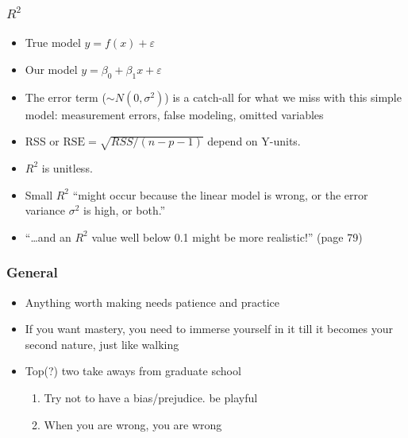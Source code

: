 \documentclass[serif, xcolor={dvipsnames}]{beamer} %
\newcommand\dangersign[1][2ex]{%
  \renewcommand\stacktype{L}%
  \scaleto{\stackon[1.3pt]{\color{red}$\triangle$}{\tiny !}}{#1}%
}
\newcommand{\Rq}{{\faSearch~}}
\begin{document}
\begin{frame}[t]
\frametitle{$R^2$}
\begin{itemize}[<+->]
\item True model $ y = f(x) + \varepsilon$\\
\item Our model $ y = \beta_0 + \beta_1x + \varepsilon$\\
\item The error term ($\sim N(0, \sigma^2)$) is a catch-all for what we miss with this
simple model: measurement errors, false modeling, omitted variables

\item RSS or $\text{RSE} = \sqrt{RSS/(n-p-1)}$ depend on Y-units. 

\item $R^2$ is unitless.

\item Small $R^2$ ``might occur because the linear model is wrong, or the error variance $\sigma^2$ is high, or both.''

\item ``\dots  and an $R^2$ value well below 0.1 might be more realistic!'' (page 79)
\end{itemize}
\end{frame}
\begin{frame}
\frametitle{General}

\begin{itemize}
\item Anything worth making needs patience and practice
\item If you want mastery, you need to immerse yourself in it till it becomes your second nature, just like walking

\vspace{.5in}
\item Top(?) two take aways from graduate school
\begin{enumerate}
\item Try not to have a bias/prejudice. be playful \Rq
\item When you are wrong, you are wrong \dangersign
\end{enumerate}
\end{itemize}
\end{frame}
\end{document}

